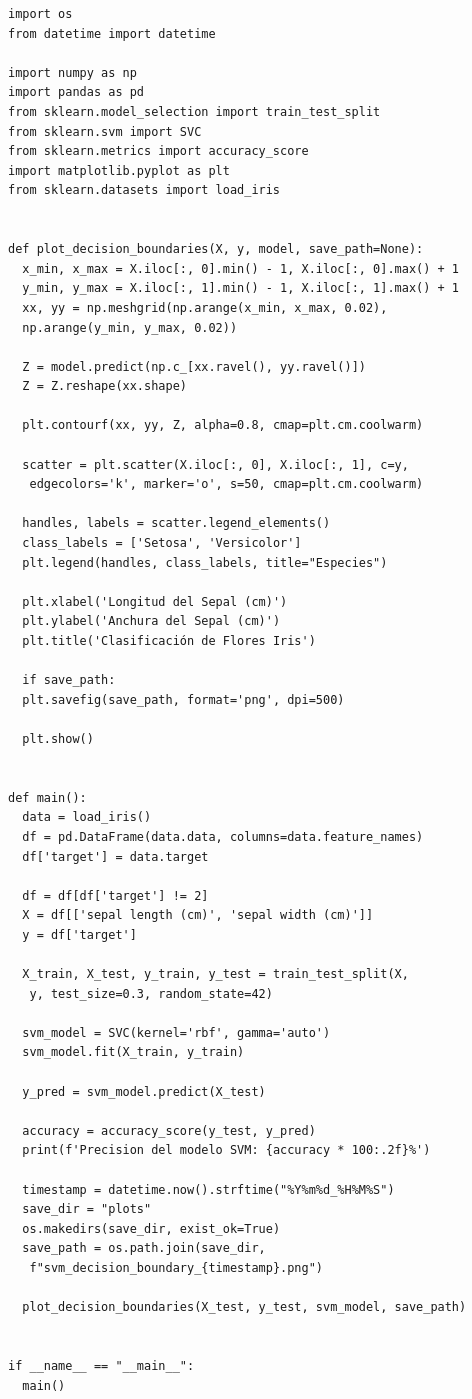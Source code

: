 \documentclass[a4paper,12pt]{article}
\begin{document}
\begin{verbatim}
import os
from datetime import datetime

import numpy as np
import pandas as pd
from sklearn.model_selection import train_test_split
from sklearn.svm import SVC
from sklearn.metrics import accuracy_score
import matplotlib.pyplot as plt
from sklearn.datasets import load_iris


def plot_decision_boundaries(X, y, model, save_path=None):
  x_min, x_max = X.iloc[:, 0].min() - 1, X.iloc[:, 0].max() + 1
  y_min, y_max = X.iloc[:, 1].min() - 1, X.iloc[:, 1].max() + 1
  xx, yy = np.meshgrid(np.arange(x_min, x_max, 0.02),
  np.arange(y_min, y_max, 0.02))
  
  Z = model.predict(np.c_[xx.ravel(), yy.ravel()])
  Z = Z.reshape(xx.shape)
  
  plt.contourf(xx, yy, Z, alpha=0.8, cmap=plt.cm.coolwarm)
  
  scatter = plt.scatter(X.iloc[:, 0], X.iloc[:, 1], c=y, 
   edgecolors='k', marker='o', s=50, cmap=plt.cm.coolwarm)
  
  handles, labels = scatter.legend_elements()
  class_labels = ['Setosa', 'Versicolor']
  plt.legend(handles, class_labels, title="Especies")
  
  plt.xlabel('Longitud del Sepal (cm)')
  plt.ylabel('Anchura del Sepal (cm)')
  plt.title('Clasificación de Flores Iris')
  
  if save_path:
  plt.savefig(save_path, format='png', dpi=500)
  
  plt.show()


def main():
  data = load_iris()
  df = pd.DataFrame(data.data, columns=data.feature_names)
  df['target'] = data.target
  
  df = df[df['target'] != 2]
  X = df[['sepal length (cm)', 'sepal width (cm)']]
  y = df['target']
  
  X_train, X_test, y_train, y_test = train_test_split(X,
   y, test_size=0.3, random_state=42)
  
  svm_model = SVC(kernel='rbf', gamma='auto')
  svm_model.fit(X_train, y_train)
  
  y_pred = svm_model.predict(X_test)
  
  accuracy = accuracy_score(y_test, y_pred)
  print(f'Precision del modelo SVM: {accuracy * 100:.2f}%')
  
  timestamp = datetime.now().strftime("%Y%m%d_%H%M%S")
  save_dir = "plots"
  os.makedirs(save_dir, exist_ok=True)
  save_path = os.path.join(save_dir,
   f"svm_decision_boundary_{timestamp}.png")
  
  plot_decision_boundaries(X_test, y_test, svm_model, save_path)


if __name__ == "__main__":
  main()
\end{verbatim}
\end{document}
